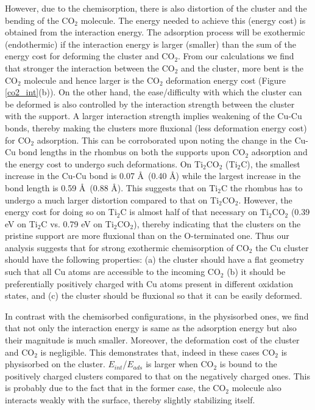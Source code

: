 However, due to the chemisorption, there is also distortion of the cluster and the bending of the CO$_2$ molecule.
The energy needed to achieve this (energy cost) is obtained from the interaction energy. The adsorption
process will be exothermic (endothermic) if the interaction energy is larger (smaller)
than the sum of the energy cost for deforming the cluster and CO$_2$. From our calculations we find that stronger 
the interaction between the CO$_2$ and the cluster,
more bent is the CO$_2$ molecule and hence larger is the CO$_2$ deformation energy cost
(Figure \ref{co2_int}(b)). On the other
hand, the ease/difficulty with which the cluster can be deformed is also controlled by the interaction strength between
the cluster with the support. A larger interaction strength implies weakening of the Cu-Cu bonds, thereby
making the clusters more fluxional (less deformation energy cost) for CO$_2$ adsorption. This can be corroborated
upon noting the change in the Cu-Cu bond lengths in the rhombus on both the supports upon CO$_2$ adsorption
and the energy cost to undergo such deformations. On Ti$_2$CO$_2$ (Ti$_2$C), the smallest increase in the Cu-Cu bond is 0.07 \AA~(0.40 \AA) while the largest increase in the bond length is 0.59 \AA~(0.88 \AA). This
suggests that on Ti$_2$C the rhombus has to undergo a much larger distortion compared to that on Ti$_2$CO$_2$.
However, the energy cost for doing so on Ti$_2$C is almost half of that necessary on Ti$_2$CO$_2$ (0.39 eV on
Ti$_2$C vs. 0.79 eV on Ti$_2$CO$_2$), thereby indicating that the clusters on the pristine support are more
fluxional than on the O-terminated one. Thus our analysis suggests that for strong exothermic chemisorption
of CO$_2$ the Cu cluster should have the following properties: (a)  the cluster should have
a flat geometry such that all Cu atoms are accessible to the incoming CO$_2$ (b) it should be preferentially
positively charged with Cu atoms present in different oxidation states, and (c) the cluster
should be fluxional so that it can be easily deformed.

In contrast with the chemisorbed configurations, in the physisorbed ones, we find that not only the interaction
energy is same as the adsorption energy but also their magnitude is much smaller. Moreover, the deformation cost of the cluster and CO$_2$ is negligible.
This demonstrates that, indeed in these cases CO$_2$ is physisorbed on the cluster. $E_{int}$/$E_{ads}$
is larger when CO$_2$ is bound to the positively charged clusters compared to that on the negatively charged ones.
This is probably due to the fact that in the former case, the CO$_2$ molecule also interacts weakly
with the surface, thereby slightly stabilizing itself.



